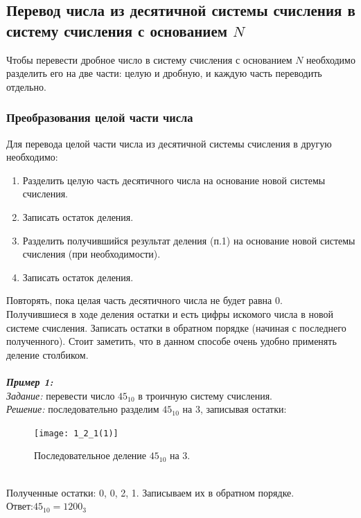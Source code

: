 \subsection{Перевод числа из десятичной системы счисления в систему счисления с основанием $N$}
Чтобы перевести дробное число в систему счисления с основанием $N$ необходимо разделить его на две части: целую и дробную, и каждую часть переводить отдельно.
\subsubsection{Преобразования целой части числа}
Для перевода целой части числа из десятичной системы счисления в другую необходимо:
\begin{enumerate}
\item Разделить целую часть десятичного числа на основание новой системы счисления.
\item Записать остаток деления.
\item Разделить получившийся результат деления (п.1) на основание новой системы счисления (при необходимости).
\item Записать остаток деления.
\end{enumerate}
Повторять, пока целая часть десятичного числа не будет равна 0.
\\Получившиеся в ходе деления остатки и есть цифры искомого числа в новой системе счисления. Записать остатки в обратном порядке (начиная с последнего полученного). Стоит заметить, что в данном способе очень удобно применять деление столбиком.
\\
\\\emph{\textbf{Пример 1:}}
\\\emph{Задание:} перевести число $45_{10}$ в троичную систему счисления.
\\\emph{Решение:} последовательно разделим $45_{10}$ на $3$, записывая остатки:
\begin{figure}[h]
\centering
\texttt{[image: 1\_2\_1(1)]}
\caption{Последовательное деление $45_{10}$ на $3$.}
\end{figure}
\\Полученные остатки: 0, 0, 2, 1. Записываем их в обратном порядке.
\\Ответ:$45_{10} = 1200_{3}$

